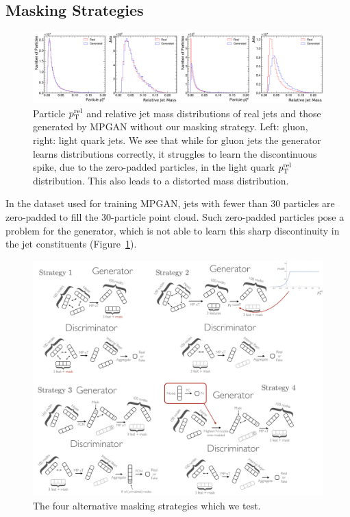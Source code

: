 \subsection{Masking Strategies}
\label{app:04_mpgan_masking}

\begin{figure}[t]
    \centering
    \centerline{\includegraphics[width=\textwidth]{figures/04-ML4Sim/mpgan/masking/zeropaddingfig.pdf}}
    \caption[Particle $\ptrel$ and relative jet mass distributions of real jets and those generated by MPGAN without our masking strategy.]{Particle $\ptrel$ and relative jet mass distributions of real jets and those generated by MPGAN without our masking strategy. Left: gluon, right: light quark jets.
    We see that while for gluon jets the generator learns distributions correctly, it struggles to learn the discontinuous spike, due to the zero-padded particles, in the light quark $\ptrel$ distribution.
    This also leads to a distorted mass distribution.
    }
    \label{fig:04_mpgan_zeropadding}
\end{figure}

In the \jetnet dataset used for training MPGAN, jets with fewer than 30 particles are zero-padded to fill the 30-particle point cloud. 
Such zero-padded particles pose a problem for the generator, which is not able to learn this sharp discontinuity in the jet constituents (Figure~\ref{fig:04_mpgan_zeropadding}).


\begin{figure}[htpb]
    \centering
    \centerline{\includegraphics[width=\textwidth]{figures/04-ML4Sim/mpgan/masking/masking.pdf}}
    \caption{The four alternative masking strategies which we test.
    }
    \label{fig:04_mpgan_masking}
\end{figure}

